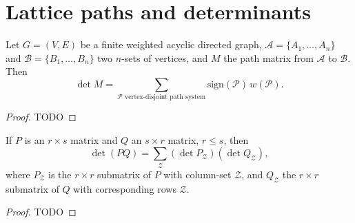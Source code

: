 \chapter{Lattice paths and determinants}

\begin{lemma}
  \label{ch32lemma}
  Let $G = (V, E)$ be a finite weighted acyclic directed graph, $\mathcal{A} =
  \{A_1, \dots, A_n\}$ and $\mathcal{B} = \{B_1, \dots, B_n\}$ two $n$-sets of
  vertices, and $M$ the path matrix from $\mathcal{A}$ to $\mathcal{B}$. Then
  \[
  \det M = \sum_{\mathcal{P} \text{ vertex-disjoint path system}} \text{sign}(\mathcal{P}) \, w(\mathcal{P}). \tag{3}
  \]
\end{lemma}
\begin{proof}
  TODO
\end{proof}

\begin{theorem}
  \label{ch32theorem}
  If $P$ is an $r\times s$ matrix and $Q$ an $s\times r$ matrix, $r\le s$, then
  \[
  \det(PQ) = \sum_{\mathcal Z}(\det P_{\mathcal Z})(\det Q_{\mathcal Z}),
  \]
  where $P_{\mathcal Z}$ is the $r\times r$ submatrix of $P$ with column-set
  $\mathcal Z$, and $Q_{\mathcal Z}$ the $r\times r$ submatrix of $Q$ with
  corresponding rows $\mathcal Z$.
\end{theorem}
\begin{proof}
  TODO
\end{proof}
